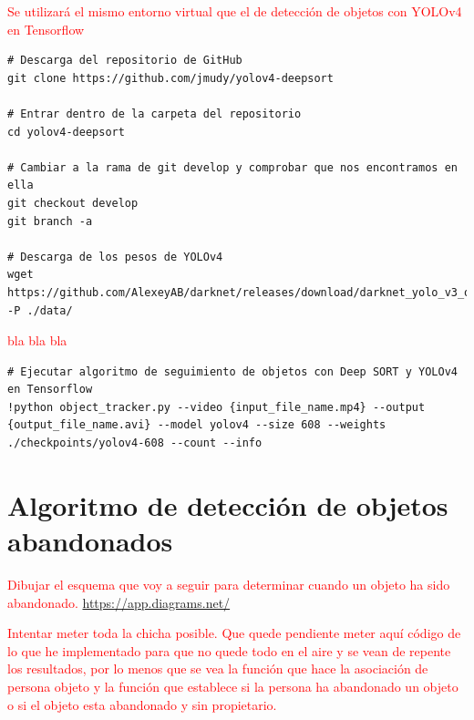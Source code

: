 \textcolor{red}{Se utilizará el mismo entorno virtual que el de detección de objetos con YOLOv4 en Tensorflow}

\vspace{0.5cm}
\begin{lstlisting}[language=iPython,caption=Evaluación del seguimiento de objetos Deep SORT y YOLOv4 en Tensorflow (1),captionpos=b,label={lst:evaluate-deepsort-tf1}]
# Descarga del repositorio de GitHub
git clone https://github.com/jmudy/yolov4-deepsort

# Entrar dentro de la carpeta del repositorio
cd yolov4-deepsort

# Cambiar a la rama de git develop y comprobar que nos encontramos en ella
git checkout develop
git branch -a

# Descarga de los pesos de YOLOv4
wget https://github.com/AlexeyAB/darknet/releases/download/darknet_yolo_v3_optimal/yolov4.weights -P ./data/
\end{lstlisting}

\textcolor{red}{bla bla bla}

\vspace{0.5cm}
\begin{lstlisting}[language=iPython,caption=Evaluación del seguimiento de objetos Deep SORT y YOLOv4 en Tensorflow (2),captionpos=b,label={lst:evaluate-deepsort-tf2}]
# Ejecutar algoritmo de seguimiento de objetos con Deep SORT y YOLOv4 en Tensorflow
!python object_tracker.py --video {input_file_name.mp4} --output {output_file_name.avi} --model yolov4 --size 608 --weights ./checkpoints/yolov4-608 --count --info
\end{lstlisting}


\newpage

\section{Algoritmo de detección de objetos abandonados}
\label{sec:algoritmo-object-detection}

\textcolor{red}{Dibujar el esquema que voy a seguir para determinar cuando un objeto ha sido abandonado.}
\url{https://app.diagrams.net/}

\textcolor{red}{Intentar meter toda la chicha posible. Que quede pendiente meter aquí código de lo que he implementado para que no quede todo en el aire y se vean de repente los resultados, por lo menos que se vea la función que hace la asociación de persona objeto y la función que establece si la persona ha abandonado un objeto o si el objeto esta abandonado y sin propietario.}

